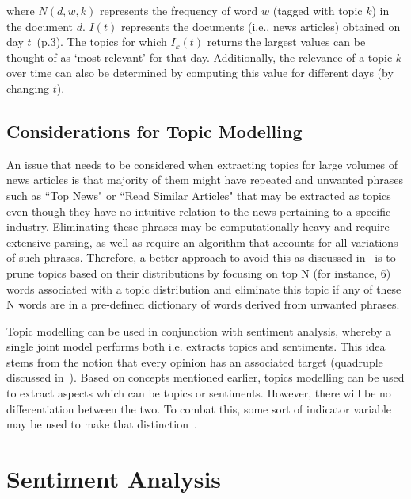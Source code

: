 \begin{enumerate}
    where $N(d,w,k)$ represents the frequency of word $w$ (tagged with topic $k$) in the document $d$. $I(t)$ represents the documents (i.e., news articles) obtained on day $t$~\cite{23_topic_extraction}(p.3). The topics for which $I_{k} (t)$ returns the largest values can be thought of as `most relevant' for that day. Additionally, the relevance of a topic $k$ over time can also be determined by computing this value for different days (by changing $t$).



    
\end{enumerate}

\subsection{Considerations for Topic Modelling}

An issue that needs to be considered when extracting topics for large volumes of news articles is that majority of them might have repeated and unwanted phrases such as ``Top News" or ``Read Similar Articles" that may be extracted as topics even though they have no intuitive relation to the news pertaining to a specific industry. Eliminating these phrases may be computationally heavy and require extensive parsing, as well as require an algorithm that accounts for all variations of such phrases. Therefore, a better approach to avoid this as discussed in~\cite{23_topic_extraction} is to prune topics based on their distributions by focusing on top N (for instance, 6) words associated with a topic distribution and eliminate this topic if any of these N words are in a pre-defined dictionary of words derived from unwanted phrases.

Topic modelling can be used in conjunction with sentiment analysis, whereby a single joint model performs both i.e. extracts topics and sentiments. This idea stems from the notion that every opinion has an associated target (quadruple discussed in~).  Based on concepts mentioned earlier, topics modelling can be used to extract aspects which can be topics or sentiments. However, there will be no differentiation between the two. To combat this, some sort of indicator variable may be used to make that distinction~\cite{16_liu2012sentiment}.

\section{Sentiment Analysis} \label{sentiment_analysis}


